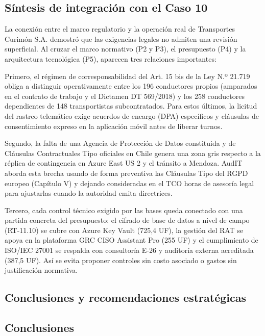 \subsection{Síntesis de integración con el Caso 10}\label{suxedntesis-de-integraciuxf3n-con-el-caso-10}

La conexión entre el marco regulatorio y la operación real de Transportes Curimón S.A. demostró que las exigencias legales no admiten una revisión superficial. Al cruzar el marco normativo (P2 y P3), el presupuesto (P4) y la arquitectura tecnológica (P5), aparecen tres relaciones importantes:

Primero, el régimen de corresponsabilidad del Art. 15 bis de la Ley N.º 21.719 obliga a distinguir operativamente entre los 196 conductores propios (amparados en el contrato de trabajo y el Dictamen DT 569/2018) y los 258 conductores dependientes de 148 transportistas subcontratados. Para estos últimos, la licitud del rastreo telemático exige acuerdos de encargo (DPA) específicos y cláusulas de consentimiento expreso en la aplicación móvil antes de liberar turnos.

Segundo, la falta de una Agencia de Protección de Datos constituida y de Cláusulas Contractuales Tipo oficiales en Chile genera una zona gris respecto a la réplica de contingencia en Azure East US 2 y el tránsito a Mendoza. AudIT aborda esta brecha usando de forma preventiva las Cláusulas Tipo del RGPD europeo (Capítulo V) y dejando consideradas en el TCO horas de asesoría legal para ajustarlas cuando la autoridad emita directrices.

Tercero, cada control técnico exigido por las bases queda conectado con una partida concreta del presupuesto: el cifrado de base de datos a nivel de campo (RT-11.10) se cubre con Azure Key Vault (725,4 UF), la gestión del RAT se apoya en la plataforma GRC CISO Assistant Pro (255 UF) y el cumplimiento de ISO/IEC 27001 se respalda con consultoría E-26 y auditoría externa acreditada (387,5 UF). Así se evita proponer controles sin costo asociado o gastos sin justificación normativa.

\subsection{Conclusiones y recomendaciones estratégicas}\label{conclusiones-y-recomendaciones-estratuxe9gicas}

\subsection{Conclusiones}\label{conclusiones}

